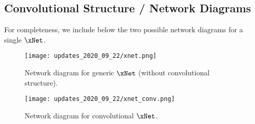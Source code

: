 %
%

\clearpage
\subsection{Convolutional Structure / Network Diagrams}
For completeness, we include below the two possible network diagrams for a
single \(\xNet\).

\begin{figure}[htpb]
  \centering
  \texttt{[image: updates\_2020\_09\_22/xnet.png]}
  \caption{Network diagram for generic \(\xNet\) (without convolutional
  structure).}
\end{figure}
%
\begin{figure}[htpb]
  \centering
  \texttt{[image: updates\_2020\_09\_22/xnet\_conv.png]}
  \caption{Network diagram for convolutional \(\xNet\).}
\end{figure}
